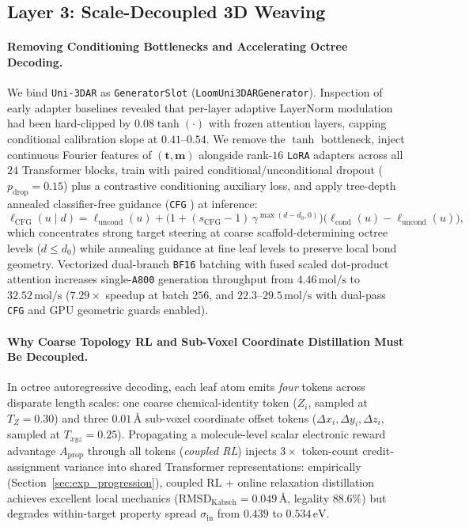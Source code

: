 \documentclass[11pt,a4paper]{article}
\begin{document}
\subsection{Layer 3: Scale-Decoupled 3D Weaving}
\label{sec:scale_decoupled}

\paragraph{Removing Conditioning Bottlenecks and Accelerating Octree Decoding.}
We bind \texttt{Uni-3DAR} \citep{lu2025uni3dar} as \texttt{GeneratorSlot} (\texttt{LoomUni3DARGenerator}). Inspection of early adapter baselines revealed that per-layer adaptive LayerNorm modulation had been hard-clipped by $0.08 \tanh(\cdot)$ with frozen attention layers, capping conditional calibration slope at $0.41\text{--}0.54$. We remove the $\tanh$ bottleneck, inject continuous Fourier features of $(\mathbf{t}, \mathbf{m})$ alongside rank-$16$ \texttt{LoRA} adapters \citep{hu2022lora} across all $24$ Transformer blocks, train with paired conditional/unconditional dropout ($p_{\text{drop}} = 0.15$) plus a contrastive conditioning auxiliary loss, and apply tree-depth annealed classifier-free guidance (\texttt{CFG} \citep{ho2022cfg}) at inference:
\begin{equation}
\label{eq:cfg}
\ell_{\text{CFG}}(u \mid d) = \ell_{\text{uncond}}(u) + \Big(1 + (s_{\text{CFG}} - 1)\,\gamma^{\max(d - d_0, 0)}\Big)\big(\ell_{\text{cond}}(u) - \ell_{\text{uncond}}(u)\big),
\end{equation}
which concentrates strong target steering at coarse scaffold-determining octree levels ($d \le d_0$) while annealing guidance at fine leaf levels to preserve local bond geometry. Vectorized dual-branch \texttt{BF16} batching with fused scaled dot-product attention increases single-\texttt{A800} generation throughput from $4.46\,\text{mol/s}$ to $32.52\,\text{mol/s}$ ($7.29\times$ speedup at batch $256$, and $22.3\text{--}29.5\,\text{mol/s}$ with dual-pass \texttt{CFG} and GPU geometric guards enabled).

\paragraph{Why Coarse Topology RL and Sub-Voxel Coordinate Distillation Must Be Decoupled.}
In octree autoregressive decoding, each leaf atom emits \emph{four} tokens across disparate length scales: one coarse chemical-identity token ($Z_i$, sampled at $T_Z = 0.30$) and three $0.01\,\text{\AA}$ sub-voxel coordinate offset tokens ($\Delta x_i, \Delta y_i, \Delta z_i$, sampled at $T_{xyz} = 0.25$). Propagating a molecule-level scalar electronic reward advantage $A_{\text{prop}}$ through all tokens (\emph{coupled RL}) injects $3\times$ token-count credit-assignment variance into shared Transformer representations: empirically (Section~\ref{sec:exp_progression}), coupled RL + online relaxation distillation achieves excellent local mechanics ($\text{RMSD}_{\text{Kabsch}} = 0.049\,\text{\AA}$, legality $88.6\%$) but degrades within-target property spread $\sigma_{\text{in}}$ from $0.439$ to $0.534\,\text{eV}$.
\end{document}
